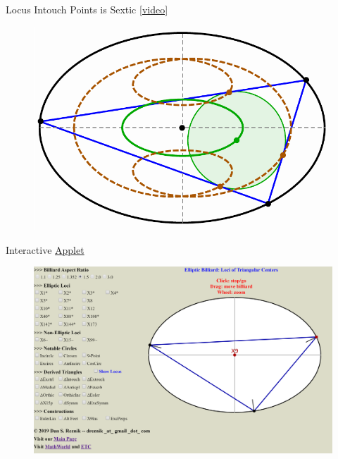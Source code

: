 \begin{frame}{Locus Intouch Points is Sextic \href{https://youtu.be/9xU6T7hQMzs}{[video]}}
\begin{figure}
\includegraphics[height=.7\textheight]{pics/0001_intro_plot.pdf}
\end{figure}
\end{frame}

\begin{frame}{Interactive \href{https://editor.p5js.org/undefined/present/i1Lin7lt7}{Applet}}
\begin{figure}
\includegraphics[height=.8\textheight]{pics/applet_p5js.png}
\end{figure}
\end{frame}  

